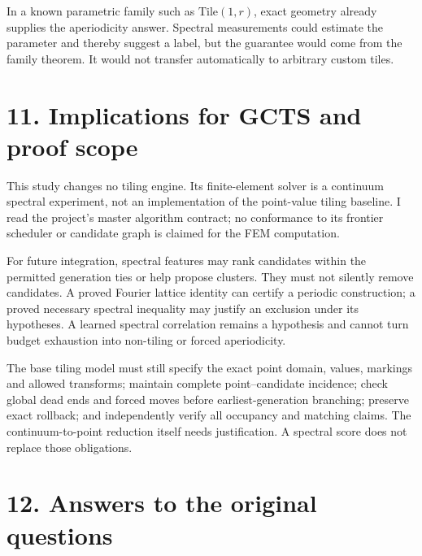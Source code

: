 \documentclass[11pt]{article}
\begin{document}
In a known parametric family such as \(\mathrm{Tile}(1,r)\), exact geometry already supplies the aperiodicity answer. Spectral measurements could estimate the parameter and thereby suggest a label, but the guarantee would come from the family theorem. It would not transfer automatically to arbitrary custom tiles.




\section*{11. Implications for GCTS and proof scope}


This study changes no tiling engine. Its finite-element solver is a continuum spectral experiment, not an implementation of the point-value tiling baseline. I read the project's master algorithm contract; no conformance to its frontier scheduler or candidate graph is claimed for the FEM computation.



For future integration, spectral features may rank candidates within the permitted generation ties or help propose clusters. They must not silently remove candidates. A proved Fourier lattice identity can certify a periodic construction; a proved necessary spectral inequality may justify an exclusion under its hypotheses. A learned spectral correlation remains a hypothesis and cannot turn budget exhaustion into non-tiling or forced aperiodicity.



The base tiling model must still specify the exact point domain, values, markings and allowed transforms; maintain complete point--candidate incidence; check global dead ends and forced moves before earliest-generation branching; preserve exact rollback; and independently verify all occupancy and matching claims. The continuum-to-point reduction itself needs justification. A spectral score does not replace those obligations.




\section*{12. Answers to the original questions}
\end{document}
